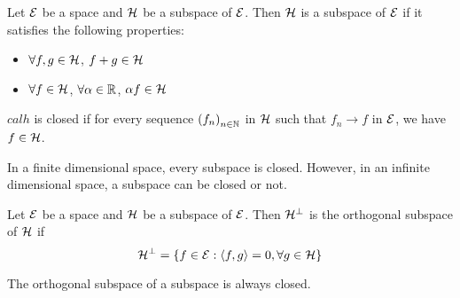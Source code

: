 \begin{definition}[subspace]
    Let $\mathcal{E}$ be a space and $\mathcal{H}$ be a subspace of $\mathcal{E}$. Then $\mathcal{H}$ is a subspace of $\mathcal{E}$ if it satisfies the following properties:
    \begin{itemize}
        \item $\forall f,g\in\mathcal{H}$, $f+g\in\mathcal{H}$
        \item $\forall f\in\mathcal{H}$, $\forall \alpha\in\mathbb{R}$, $\alpha f\in\mathcal{H}$
    \end{itemize}
\end{definition}
\begin{proposition}
    $calh$ is closed if for every sequence $\left(f_n\right)_{n\in\mathbb{N}}$ in $\mathcal{H}$ such that $f_n\rightarrow f$ in $\mathcal{E}$, we have $f\in\mathcal{H}$.
\end{proposition}
\begin{remark}
    In a finite dimensional space, every subspace is closed. However, in an infinite dimensional space, a subspace can be closed or not.
\end{remark}
\begin{definition}
    Let $\mathcal{E}$ be a space and $\mathcal{H}$ be a subspace of $\mathcal{E}$. Then $\mathcal{H}^{\perp}$ is the orthogonal subspace of $\mathcal{H}$ if
    \begin{equation*}
        \mathcal{H}^{\perp}=\left\{f\in\mathcal{E}:\left\langle f,g\right\rangle=0,\forall g\in\mathcal{H}\right\}
    \end{equation*}
\end{definition}
\begin{remark}
    The orthogonal subspace of a subspace is always closed.
\end{remark}

